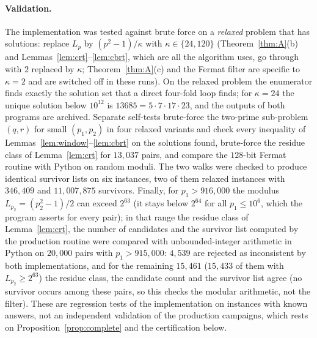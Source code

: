 \documentclass[11pt]{amsart}
\theoremstyle{definition}
\theoremstyle{remark}
\begin{document}
\paragraph{Validation.} The implementation was tested against brute force on a \emph{relaxed} problem that has solutions: replace $L_p$ by $(p^2-1)/\kappa$ with $\kappa\in\{24,120\}$ (Theorem~\ref{thm:A}(b) and Lemmas~\ref{lem:crt}--\ref{lem:cbrt}, which are all the algorithm uses, go through with $2$ replaced by $\kappa$; Theorem~\ref{thm:A}(c) and the Fermat filter are specific to $\kappa=2$ and are switched off in these runs). On the relaxed problem the enumerator finds exactly the solution set that a direct four-fold loop finds; for $\kappa=24$ the unique solution below $10^{12}$ is $13685=5\cdot7\cdot17\cdot23$, and the outputs of both programs are archived. Separate self-tests brute-force the two-prime sub-problem $(q,r)$ for small $(p_1,p_2)$ in four relaxed variants and check every inequality of Lemmas~\ref{lem:window}--\ref{lem:cbrt} on the solutions found, brute-force the residue class of Lemma~\ref{lem:crt} for $13{,}037$ pairs, and compare the $128$-bit Fermat routine with Python on random moduli. The two walks were checked to produce identical survivor lists on six instances, two of them relaxed instances with $346{,}409$ and $11{,}007{,}875$ survivors. Finally, for $p_1>916{,}000$ the modulus $L_{p_2}=(p_2^2-1)/2$ can exceed $2^{63}$ (it stays below $2^{64}$ for all $p_1\le10^6$, which the program asserts for every pair); in that range the residue class of Lemma~\ref{lem:crt}, the number of candidates and the survivor list computed by the production routine were compared with unbounded-integer arithmetic in Python on $20{,}000$ pairs with $p_1>915{,}000$: $4{,}539$ are rejected as inconsistent by both implementations, and for the remaining $15{,}461$ ($15{,}433$ of them with $L_{p_2}\ge2^{63}$) the residue class, the candidate count and the survivor list agree (no survivor occurs among these pairs, so this checks the modular arithmetic, not the filter). These are regression tests of the implementation on instances with known answers, not an independent validation of the production campaigns, which rests on Proposition~\ref{prop:complete} and the certification below.
\end{document}
